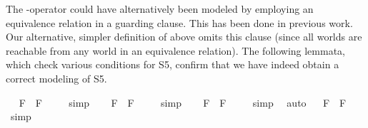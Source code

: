 \begin{isabellebody}
%
\begin{isamarkuptext}%
The \isa{{\isasymbox}}-operator could have alternatively been modeled by employing an equivalence relation  in a 
  guarding clause. This has been done in previous work. Our alternative, simpler definition of 
  \isa{{\isasymbox}} above omits
  this clause (since all worlds are reachable from any world in an equivalence relation). The 
  following lemmata, which check various conditions for S5, confirm that we have indeed 
  obtain a correct modeling of S5.%
\end{isamarkuptext}\isamarkuptrue%
\ \isamarkupfalse%
\ {\isachardoublequoteopen}{\isacharbrackleft}\isactrlbold {\isasymbox}{\isasymphi}\isactrlsup F\ \isactrlbold {\isasymrightarrow}\ {\isasymphi}\isactrlsup F{\isacharbrackright}\ {\isacharequal}\ {\isasymtop}{\isachardoublequoteclose}%
\isadelimproof
\ %
\endisadelimproof
%
\isatagproof
{}\isamarkupfalse%
\ simp\ \isamarkupfalse%
%
\endisatagproof
{\isafoldproof}%
%
\isadelimproof
%
\endisadelimproof
\isanewline
\ \isamarkupfalse%
\ {\isachardoublequoteopen}{\isacharbrackleft}{\isasymphi}\isactrlsup F\ \isactrlbold {\isasymrightarrow}\ \isactrlbold {\isasymbox}\isactrlbold {\isasymdiamond}{\isasymphi}\isactrlsup F{\isacharbrackright}\ {\isacharequal}\ {\isasymtop}{\isachardoublequoteclose}%
\isadelimproof
\ %
\endisadelimproof
%
\isatagproof
{}\isamarkupfalse%
\ simp\ \isamarkupfalse%
%
\endisatagproof
{\isafoldproof}%
%
\isadelimproof
%
\endisadelimproof
\isanewline
\ \isamarkupfalse%
\ {\isachardoublequoteopen}{\isacharbrackleft}\isactrlbold {\isasymbox}{\isasymphi}\isactrlsup F\ \isactrlbold {\isasymrightarrow}\ \isactrlbold {\isasymdiamond}{\isasymphi}\isactrlsup F{\isacharbrackright}\ {\isacharequal}\ {\isasymtop}{\isachardoublequoteclose}%
\isadelimproof
\ %
\endisadelimproof
%
\isatagproof
{}\isamarkupfalse%
\ simp\ \isamarkupfalse%
\ auto%
\endisatagproof
{\isafoldproof}%
%
\isadelimproof
%
\endisadelimproof
\isanewline
\ \isamarkupfalse%
\ {\isachardoublequoteopen}{\isacharbrackleft}\isactrlbold {\isasymbox}{\isasymphi}\isactrlsup F\ \isactrlbold {\isasymrightarrow}\ \isactrlbold {\isasymbox}\isactrlbold {\isasymbox}{\isasymphi}\isactrlsup F{\isacharbrackright}\ {\isacharequal}\ {\isasymtop}{\isachardoublequoteclose}%
\isadelimproof
\ %
\endisadelimproof
%
\isatagproof
{}\isamarkupfalse%
\ simp\ \isamarkupfalse%
%
\endisatagproof

\end{isabellebody}
